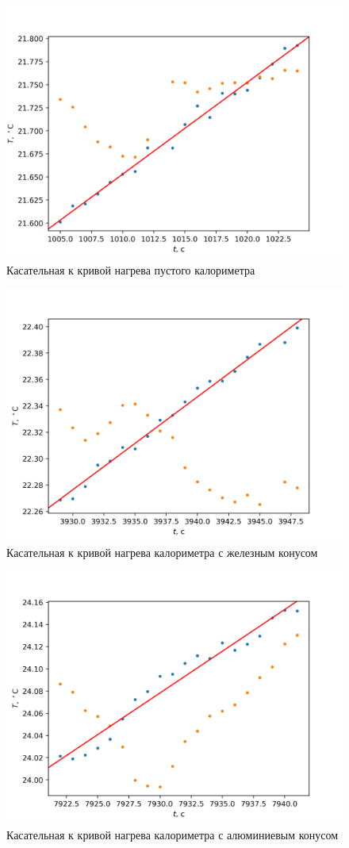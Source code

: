 \documentclass[a4paper, 12pt]{article}
\begin{document}
    \begin{figure}[ht!]
        \centering\includegraphics[width=0.6\linewidth]{img/1013.png}
        \caption{Касательная к кривой нагрева пустого калориметра}
    \end{figure}
    \begin{figure}[ht!]
        \centering\includegraphics[width=0.6\linewidth]{img/3937.png}
        \caption{Касательная к кривой нагрева калориметра с железным конусом}
    \end{figure}
    \begin{figure}[ht!]
        \centering\includegraphics[width=0.6\linewidth]{img/7930.png}
        \caption{Касательная к кривой нагрева калориметра с алюминиевым конусом}
    \end{figure}
\end{document}
